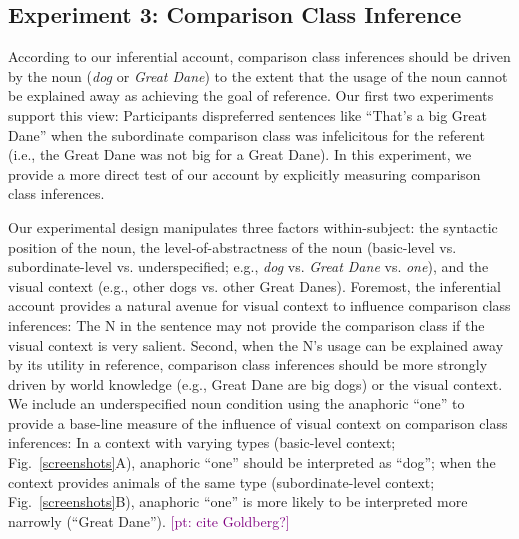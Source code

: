\documentclass[10pt,letterpaper]{article}
\newcommand{\pt}[1]{\textcolor{Purple}{[pt: #1]}}
\begin{document}
\subsection{Experiment 3: Comparison Class Inference}%
According to our inferential account, comparison class inferences should be driven by the noun (\emph{dog} or \emph{Great Dane}) to the extent that the usage of the noun cannot be explained away as achieving the goal of reference.
Our first two experiments support this view: Participants dispreferred sentences like ``That's a big Great Dane'' when the subordinate comparison class was infelicitous for the referent (i.e., the Great Dane was not big for a Great Dane).
In this experiment, we provide a more direct test of our account by explicitly measuring comparison class inferences.

Our experimental design manipulates three factors within-subject: the syntactic position of the noun, the level-of-abstractness of the noun (basic-level vs. subordinate-level vs. underspecified; e.g., \emph{dog} vs. \emph{Great Dane} vs. \emph{one}), and the visual context (e.g., other dogs vs. other Great Danes).
Foremost, the inferential account provides a natural avenue for visual context to influence comparison class inferences: The N in the sentence may not provide the comparison class if the visual context is very salient. 
Second, when the N's usage can be explained away by its utility in reference, comparison class inferences should be more strongly driven by world knowledge (e.g., Great Dane are big dogs) or the visual context. 
We include an underspecified noun condition using the anaphoric ``one'' to provide a base-line measure of the influence of visual context on comparison class inferences: In a context with varying types (basic-level context; Fig.~\ref{screenshots}A), anaphoric ``one'' should be interpreted as ``dog''; when the context provides animals of the same type (subordinate-level context; Fig.~\ref{screenshots}B), anaphoric ``one'' is more likely to be interpreted more narrowly (``Great Dane''). \pt{cite Goldberg?} 
\end{document}
